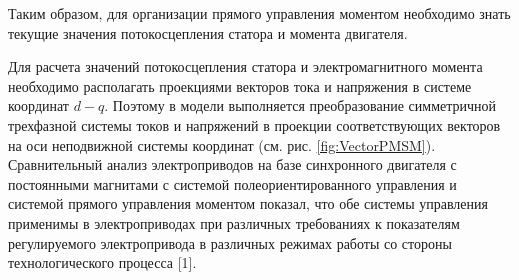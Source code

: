 Таким образом, для организации прямого управления моментом необходимо знать текущие значения потокосцепления статора и момента двигателя.

Для расчета значений потокосцепления статора и электромагнитного момента необходимо располагать проекциями векторов тока и напряжения в системе координат $d-q$. Поэтому в модели выполняется преобразование симметричной трехфазной системы токов и напряжений в проекции соответствующих векторов на оси неподвижной системы координат (см. рис. \ref{fig:VectorPMSM}). 
Сравнительный анализ электроприводов на базе синхронного двигателя с постоянными магнитами с системой полеориентированного управления и системой прямого управления
моментом показал, что обе системы управления применимы в электроприводах при различных требованиях к показателям регулируемого электропривода в различных режимах работы со стороны технологического процесса [1].
